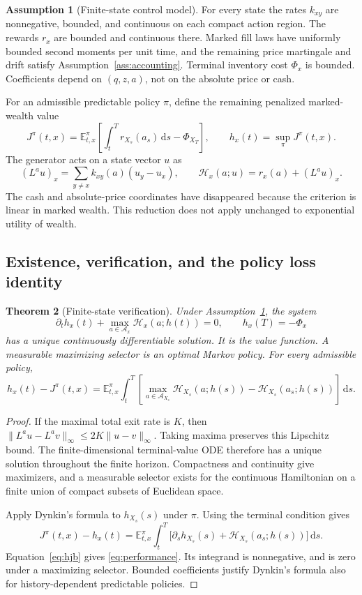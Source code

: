 \documentclass[11pt]{article}
\theoremstyle{plain}
\newtheorem{theorem}{Theorem}[section]
\theoremstyle{definition}
\newtheorem{assumption}[theorem]{Assumption}
\theoremstyle{remark}
\newcommand{\E}{\mathbb E}
\newcommand{\dd}{\,\mathrm d}
\newcommand{\norm}[1]{\lVert#1\rVert}
\newcommand{\HH}{\mathcal H}
\newcommand{\cAct}{\mathcal A}
\begin{document}
\begin{assumption}[Finite-state control model]\label{ass:finite}
For every state the rates \(k_{xy}\) are nonnegative, bounded, and
continuous on each compact action region. The rewards \(r_x\) are
bounded and continuous there. Marked fill laws have uniformly bounded
second moments per unit time, and the remaining price martingale and drift
satisfy Assumption~\ref{ass:accounting}. Terminal inventory cost
\(\Phi_x\) is bounded. Coefficients depend on \((q,z,a)\), not on the
absolute price or cash.
\end{assumption}

For an admissible predictable policy \(\pi\), define the remaining
penalized marked-wealth value
\[
J^\pi(t,x)=
\E^\pi_{t,x}\left[\int_t^T r_{X_s}(a_s)\dd s-\Phi_{X_T}\right],
\qquad h_x(t)=\sup_\pi J^\pi(t,x).
\]
The generator acts on a state vector \(u\) as
\[
(L^a u)_x=\sum_{y\ne x}k_{xy}(a)(u_y-u_x),
\qquad
\HH_x(a;u)=r_x(a)+(L^a u)_x.
\]
The cash and absolute-price coordinates have disappeared because the
criterion is linear in marked wealth. This reduction does not apply
unchanged to exponential utility of wealth.

\subsection{Existence, verification, and the policy loss identity}

\begin{theorem}[Finite-state verification]\label{thm:verification}
Under Assumption~\ref{ass:finite}, the system
\begin{equation}\label{eq:hjb}
\partial_t h_x(t)+\max_{a\in\cAct_x}\HH_x(a;h(t))=0,
\qquad h_x(T)=-\Phi_x
\end{equation}
has a unique continuously differentiable solution. It is the value
function. A measurable maximizing selector is an optimal Markov policy.
For every admissible policy,
\begin{equation}\label{eq:performance}
h_x(t)-J^\pi(t,x)=
\E^\pi_{t,x}\int_t^T
\left[\max_{a\in\cAct_{X_s}}\HH_{X_s}(a;h(s))
             -\HH_{X_s}(a_s;h(s))\right]\dd s .
\end{equation}
\end{theorem}
\begin{proof}
If the maximal total exit rate is \(K\), then
\(\norm{L^a u-L^a v}_\infty\le2K\norm{u-v}_\infty\).
Taking maxima preserves this Lipschitz bound. The finite-dimensional
terminal-value ODE therefore has a unique solution throughout the
finite horizon. Compactness and continuity give maximizers, and a
measurable selector exists for the continuous Hamiltonian on a finite
union of compact subsets of Euclidean space.

Apply Dynkin's formula to \(h_{X_s}(s)\) under \(\pi\).
Using the terminal condition gives
\[
J^\pi(t,x)-h_x(t)
=\E^\pi_{t,x}\int_t^T
\big[\partial_s h_{X_s}(s)+\HH_{X_s}(a_s;h(s))\big]\dd s.
\]
Equation~\eqref{eq:hjb} gives \eqref{eq:performance}. Its integrand is
nonnegative, and is zero under a maximizing selector. Bounded
coefficients justify Dynkin's formula also for history-dependent
predictable policies.
\end{proof}
\end{document}
